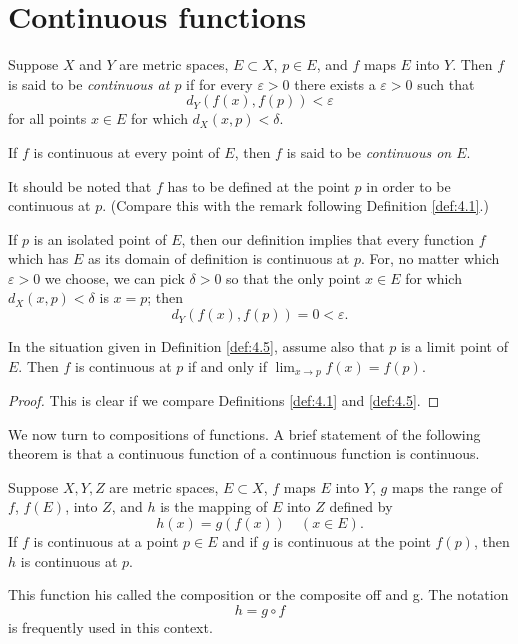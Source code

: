 
\section{Continuous functions}

\begin{mydef}
    \label{def:4.5}
    Suppose $X$ and $Y$ are metric spaces, $E \subset X$, $p \in E$, and $f$ maps $E$ into $Y$. Then $f$ is said to be \emph{continuous at $p$} if for every $\varepsilon > 0$ there exists a $\varepsilon > 0$ such that
    \begin{equation*}
        d_Y (f(x), f(p)) < \varepsilon
    \end{equation*}
    for all points $x \in  E$ for which $d_X(x, p) < \delta$.
    
    If $f$ is continuous at every point of $E$, then $f$ is said to be \emph{continuous on $E$}.
    
    It should be noted that $f$ has to be defined at the point $p$ in order to be continuous at $p$. (Compare this with the remark following Definition \ref{def:4.1}.)

    If $p$ is an isolated point of $E$, then our definition implies that every function $f$ which has $E$ as its domain of definition is continuous at $p$. For, no matter which $\varepsilon > 0$ we choose, we can pick $\delta > 0$ so that the only point $x \in  E$ for which $d_X(x,p) <\delta$ is $x = p$; then
    \begin{equation*}
        d_Y(f(x),f(p)) = 0 < \varepsilon.
    \end{equation*}
\end{mydef}

\begin{thm}
    \label{thm:4.6}
    In the situation given in Definition \ref{def:4.5}, assume also that $p$ is a limit point of $E$. Then $f$ is continuous at $p$ if and only if $\lim_{x \to p}  f(x) = f(p)$.
\end{thm}
\begin{proof}
    This is clear if we compare Definitions \ref{def:4.1} and \ref{def:4.5}.
\end{proof}


We now turn to compositions of functions. 
A brief statement of the following theorem is that a continuous function of a continuous function is continuous.
\begin{thm}
    \label{thm:4.7}
    Suppose $X, Y, Z$ are metric spaces, $E \subset X$, $f$ maps $E$ into $Y$, $g$ maps the range of $f$, $f(E)$, into $Z$, and $h$ is the mapping of $E$ into $Z$ defined by 
    \begin{equation*}
        h(x) = g(f(x)) \quad
    (x \in  E).
    \end{equation*}
    If $f$ is continuous at a point $p \in E$ and if $g$ is continuous at the point $f(p)$, then $h$ is continuous at $p$.

    This function his called the composition or the composite off and g. The notation
    \begin{equation*}
        h = g \circ f
    \end{equation*}
    is frequently used in this context.
\end{thm}

